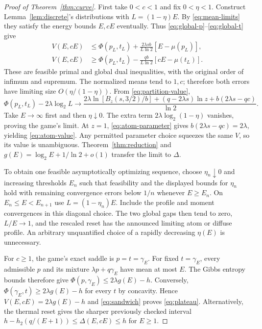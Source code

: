 \documentclass[11pt]{article}
\newcommand{\gE}{\gamma_E}
\newcommand{\hbin}{h_2}
\begin{document}
\begin{proof}[Proof of Theorem~\ref{thm:curve}]
First take $0<c<1$ and fix $0<\eta<1$. Construct Lemma~\ref{lem:discrete}'s distributions with $L=(1-\eta)E$. By \eqref{eq:mean-limits} they satisfy the energy bounds $E,cE$ eventually. Thus \eqref{eq:global-p}--\eqref{eq:global-t} give
\begin{align*}
 V(E,cE)&\le\Phi(p_L,t_L)+\frac{2\lambda sb}{L\ln2}[E-\mu(p_L)],\\
 V(E,cE)&\ge\Phi(p_L,t_L)-\frac{qb}{L\ln2}[cE-\mu(t_L)].
\end{align*}
These are feasible primal and global dual inequalities, with the original order of infimum and supremum. The normalized means tend to $1,c$; therefore both errors have limiting size $O(\eta/(1-\eta))$. From \eqref{eq:partition-value},
\[
 \Phi(p_L,t_L)-2\lambda\log_2L\longrightarrow
 \frac{2\lambda\ln[B_z(s,3/2)/b]+(q-2\lambda s)\ln z+b(2\lambda s-qc)}{\ln2}.
\]
Take $E\to\infty$ first and then $\eta\downarrow0$. The extra term $2\lambda\log_2(1-\eta)$ vanishes, proving the game's limit. At $z=1$, \eqref{eq:atom-parameter} gives $b(2\lambda s-qc)=2\lambda$, yielding \eqref{eq:atom-value}. Any permitted parameter choice squeezes the same $V$, so its value is unambiguous. Theorem~\ref{thm:reduction} and $g(E)=\log_2E+1/\ln2+o(1)$ transfer the limit to $\Delta$.

To obtain one feasible asymptotically optimizing sequence, choose $\eta_n\downarrow0$ and increasing thresholds $E_n$ such that feasibility and the displayed bounds for $\eta_n$ hold with remaining convergence errors below $1/n$ whenever $E\ge E_n$. On $E_n\le E<E_{n+1}$ use $L=(1-\eta_n)E$. Include the profile and moment convergences in this diagonal choice. The two global gaps then tend to zero, $L/E\to1$, and the rescaled reset has the announced limiting atom or diffuse profile. An arbitrary unquantified choice of a rapidly decreasing $\eta(E)$ is unnecessary.

For $c\ge1$, the game's exact saddle is $p=t=\gE$. For fixed $t=\gE$, every admissible $p$ and its mixture $\lambda p+q\gE$ have mean at most $E$. The Gibbs entropy bounds therefore give $\Phi(p,\gE)\le2\lambda g(E)-h$. Conversely, $\Phi(\gE,t)\ge2\lambda g(E)-h$ for every $t$ by concavity. Hence $V(E,cE)=2\lambda g(E)-h$ and \eqref{eq:sandwich} proves \eqref{eq:plateau}. Alternatively, the thermal reset gives the sharper previously checked interval $h-\hbin(q/(E+1))\le\Delta(E,cE)\le h$ for $E\ge1$.
\end{proof}
\end{document}
